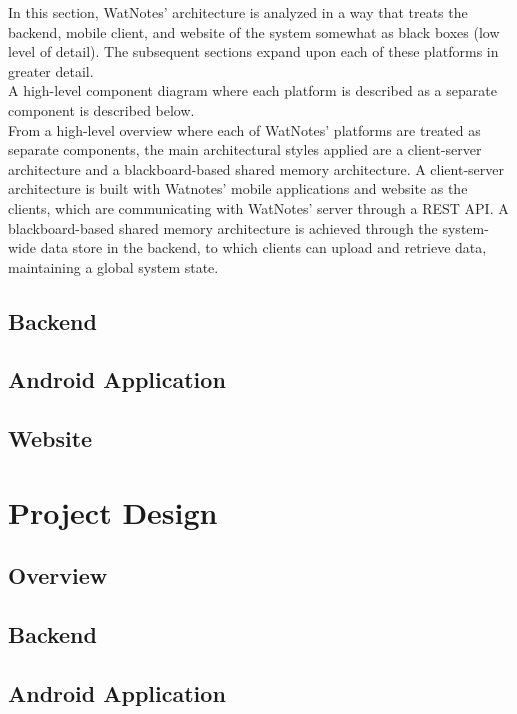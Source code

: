 \documentclass[12pt]{article}
\begin{document}
    In this section, WatNotes' architecture is analyzed in a way that treats the backend, mobile client, and website of the system
    somewhat as black boxes (low level of detail). The subsequent sections expand upon each of these platforms in greater detail. \\

    A high-level component diagram where each platform is described as a separate component is described below. \\

    From a high-level overview where each of WatNotes' platforms are treated as separate components, the main architectural styles applied are
    a client-server architecture and a blackboard-based shared memory architecture. A client-server architecture is built with Watnotes' mobile
    applications and website as the clients, which are communicating with WatNotes' server through a REST API. A blackboard-based shared memory
    architecture is achieved through the system-wide data store in the backend, to which clients can upload and retrieve data, maintaining a
    global system state. \\

  \subsection{Backend}
  \subsection{Android Application}
  \subsection{Website}

  \newpage

  \section{Project Design}
  \subsection{Overview}
  \subsection{Backend}
  \subsection{Android Application}
\end{document}
